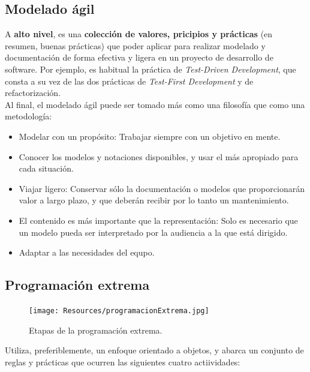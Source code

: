 \subsection{Modelado ágil}

A \textbf{alto nivel}, es una \textbf{colección de valores, pricipios y prácticas} (en resumen, buenas prácticas) que poder aplicar para realizar modelado y documentación de forma efectiva y ligera en un proyecto de desarrollo de software. Por ejemplo, es habitual la práctica de \textit{Test-Driven Development}, que consta a su vez de las dos prácticas de \textit{Test-First Development} y de refactorización.\\

Al final, el modelado ágil puede ser tomado más como una filosofía que como una metodología:

\begin{itemize}
   \item Modelar con un propósito: Trabajar siempre con un objetivo en mente.
   \item Conocer los modelos y notaciones disponibles, y usar el más apropiado para cada situación.
   \item Viajar ligero: Conservar sólo la documentación o modelos que proporcionarán valor a largo plazo, y que deberán recibir por lo tanto un mantenimiento.
   \item El contenido es más importante que la representación: Solo es necesario que un modelo pueda ser interpretado por la audiencia a la que está dirigido.
   \item Adaptar a las necesidades del equpo.
\end{itemize}

\subsection{Programación extrema}

\begin{figure}[H]
   \centering
   \texttt{[image: Resources/programacionExtrema.jpg]}
   \caption{Etapas de la programación extrema.}
   \label{fig:programacionExtrema}
\end{figure}

Utiliza, preferiblemente, un enfoque orientado a objetos, y abarca un conjunto de reglas y prácticas que ocurren las siguientes cuatro actiividades:

